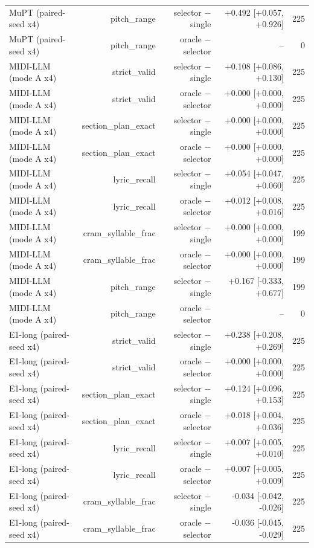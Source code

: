 \begin{table}[t]
\begin{tabular}{lrrrr}
MuPT (paired-seed x4) & pitch\_range & selector $-$ single & +0.492 [+0.057, +0.926] & 225 \\
MuPT (paired-seed x4) & pitch\_range & oracle $-$ selector & – & 0 \\
MIDI-LLM (mode A x4) & strict\_valid & selector $-$ single & +0.108 [+0.086, +0.130] & 225 \\
MIDI-LLM (mode A x4) & strict\_valid & oracle $-$ selector & +0.000 [+0.000, +0.000] & 225 \\
MIDI-LLM (mode A x4) & section\_plan\_exact & selector $-$ single & +0.000 [+0.000, +0.000] & 225 \\
MIDI-LLM (mode A x4) & section\_plan\_exact & oracle $-$ selector & +0.000 [+0.000, +0.000] & 225 \\
MIDI-LLM (mode A x4) & lyric\_recall & selector $-$ single & +0.054 [+0.047, +0.060] & 225 \\
MIDI-LLM (mode A x4) & lyric\_recall & oracle $-$ selector & +0.012 [+0.008, +0.016] & 225 \\
MIDI-LLM (mode A x4) & cram\_syllable\_frac & selector $-$ single & +0.000 [+0.000, +0.000] & 199 \\
MIDI-LLM (mode A x4) & cram\_syllable\_frac & oracle $-$ selector & +0.000 [+0.000, +0.000] & 199 \\
MIDI-LLM (mode A x4) & pitch\_range & selector $-$ single & +0.167 [-0.333, +0.677] & 199 \\
MIDI-LLM (mode A x4) & pitch\_range & oracle $-$ selector & – & 0 \\
E1-long (paired-seed x4) & strict\_valid & selector $-$ single & +0.238 [+0.208, +0.269] & 225 \\
E1-long (paired-seed x4) & strict\_valid & oracle $-$ selector & +0.000 [+0.000, +0.000] & 225 \\
E1-long (paired-seed x4) & section\_plan\_exact & selector $-$ single & +0.124 [+0.096, +0.153] & 225 \\
E1-long (paired-seed x4) & section\_plan\_exact & oracle $-$ selector & +0.018 [+0.004, +0.036] & 225 \\
E1-long (paired-seed x4) & lyric\_recall & selector $-$ single & +0.007 [+0.005, +0.010] & 225 \\
E1-long (paired-seed x4) & lyric\_recall & oracle $-$ selector & +0.007 [+0.005, +0.009] & 225 \\
E1-long (paired-seed x4) & cram\_syllable\_frac & selector $-$ single & -0.034 [-0.042, -0.026] & 225 \\
E1-long (paired-seed x4) & cram\_syllable\_frac & oracle $-$ selector & -0.036 [-0.045, -0.029] & 225 \\

\end{tabular}
\end{table}
